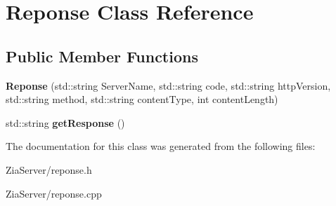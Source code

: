 \hypertarget{class_reponse}{
\section{Reponse Class Reference}
\label{class_reponse}
}
\subsection*{Public Member Functions}
\begin{DoxyCompactItemize}
\item 
\hypertarget{class_reponse_a64d485845bb40fe9d20f617b9b3ec9fd}{
{\bfseries Reponse} (std::string ServerName, std::string code, std::string httpVersion, std::string method, std::string contentType, int contentLength)}
\label{class_reponse_a64d485845bb40fe9d20f617b9b3ec9fd}

\item 
\hypertarget{class_reponse_a50c6e746b49d0edc7a7f9f180b76d69f}{
std::string {\bfseries getResponse} ()}
\label{class_reponse_a50c6e746b49d0edc7a7f9f180b76d69f}

\end{DoxyCompactItemize}


The documentation for this class was generated from the following files:\begin{DoxyCompactItemize}
\item 
ZiaServer/reponse.h\item 
ZiaServer/reponse.cpp\end{DoxyCompactItemize}

